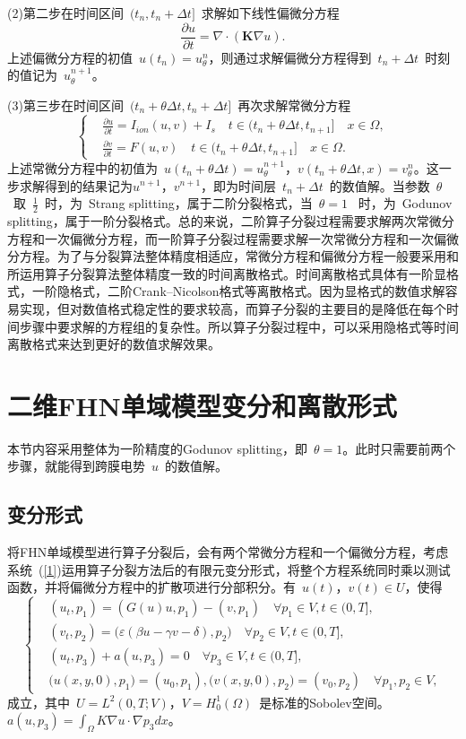 \documentclass[twoside,UTF8]{nputhesis}
\begin{document}
(2)第二步在时间区间~$(t_n,t_n+\Delta t]$~求解如下线性偏微分方程
\begin{equation*}
\frac{\partial u}{\partial t}=\nabla\cdot(\textbf{K}\nabla u).
\end{equation*}
上述偏微分方程的初值~$u(t_n)=u^n_\theta$，则通过求解偏微分方程得到~$t_n+\Delta t$~时刻的值记为~$u^{n+1}_\theta$。

(3)第三步在时间区间~$(t_n+\theta\Delta t,t_n+\Delta t]$~再次求解常微分方程
\begin{equation*}
\left\{\begin{aligned}&\frac{\partial u}{\partial t}=I_{ion}(u,v)+I_s \quad t\in(t_n+\theta \Delta t,t_{n+1}]\quad x\in\Omega,\\& \frac{\partial v}{\partial t}=F(u,v) \quad t\in(t_n+\theta \Delta t,t_{n+1}]\quad x\in\Omega.\end{aligned}\right.
\label{1.3}
\end{equation*}
上述常微分方程中的初值为~$u(t_n+\theta\Delta t)=u^{n+1}_\theta$，$v(t_n+\theta\Delta t,x)=v^{n}_\theta$。这一步求解得到的结果记为$u^{n+1}$，$v^{n+1}$，即为时间层~$t_n+\Delta t$~的数值解。当参数~$\theta$~取~$\frac{1}{2}$~时，为~Strang splitting，属于二阶分裂格式，当~$\theta=1$~ 时，为~Godunov splitting，属于一阶分裂格式。总的来说，二阶算子分裂过程需要求解两次常微分方程和一次偏微分方程，而一阶算子分裂过程需要求解一次常微分方程和一次偏微分方程。为了与分裂算法整体精度相适应，常微分方程和偏微分方程一般要采用和所运用算子分裂算法整体精度一致的时间离散格式。时间离散格式具体有一阶显格式，一阶隐格式，二阶Crank–Nicolson格式等离散格式。因为显格式的数值求解容易实现，但对数值格式稳定性的要求较高，而算子分裂的主要目的是降低在每个时间步骤中要求解的方程组的复杂性。所以算子分裂过程中，可以采用隐格式等时间离散格式来达到更好的数值求解效果。
\section{二维FHN单域模型变分和离散形式}

本节内容采用整体为一阶精度的Godunov splitting，即~$\theta=1$。此时只需要前两个步骤，就能得到跨膜电势~$u$~的数值解。
\subsection{变分形式}
将FHN单域模型进行算子分裂后，会有两个常微分方程和一个偏微分方程，考虑系统~(\ref{1})运用算子分裂方法后的有限元变分形式，将整个方程系统同时乘以测试函数，并将偏微分方程中的扩散项进行分部积分。有~$u(t)$，$v(t)\in U$，使得
\begin{equation}
\left\{\begin{aligned}&(u_t,p_1)=(G(u)u,p_1)-(v,p_1)\quad \forall  p_1\in V,t\in(0,T],
\\&(v_t,p_2)=\big(\varepsilon(\beta u-\gamma v-\delta),p_2\big)\quad \forall p_2\in V,t\in(0,T],
\\&(u_t,p_3)+a(u,p_3)=0\quad \forall p_3\in V,t\in(0,T],
\\&\big(u(x,y,0),p_1\big)=(u_0,p_1),\big(v(x,y,0),p_2\big)=(v_0,p_2)\quad \forall p_1,p_2\in V,\end{aligned}\right.
\label{91}
\end{equation}
成立，其中~$U=L^2(0,T;V)$，$V=H^1_0(\Omega)$~是标准的Sobolev空间。$a(u,p_3)=\int_\Omega K\nabla u\cdot\nabla p_3 dx$。
\end{document}
